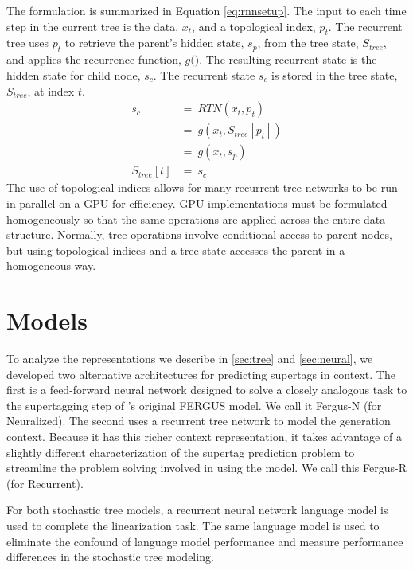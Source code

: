\documentclass[11pt]{article}
\begin{document}
The formulation is summarized in Equation \ref{eq:rnnsetup}.
%
The input to each time step in the current tree is the data, $x_t$, and a topological
index, $p_t$.
%
The recurrent tree uses $p_t$ to retrieve the parent's hidden state, $s_p$, from the
tree state, $S_{tree}$, and applies the recurrence function, $g(\dot)$.
%
The resulting recurrent state is the hidden state for child node, $s_c$.
%
The recurrent state $s_c$ is stored in the tree state, $S_{tree}$, at index $t$.
%
\begin{align}
       s_c~&=~RTN(x_t,p_t) \nonumber \\
           &=~g(x_t,S_{tree}[p_t]) \nonumber \\
           &=~g(x_t, s_p) \nonumber \\
S_{tree}[t]&=~s_c \label{eq:rnnsetup}
\end{align}
%
The use of topological indices allows for many recurrent tree networks to be
run in parallel on a GPU for efficiency.
%
GPU implementations must be formulated homogeneously so that 
the same operations are applied across the entire data structure.
%
Normally, tree operations involve conditional access to parent nodes,
but using topological indices and a tree state accesses the parent in
a homogeneous way.

\section{Models}
\label{sec:models}

To analyze the representations we describe in \ref{sec:tree} and
\ref{sec:neural}, we developed two alternative architectures for
predicting supertags in context.
%
The first is a feed-forward neural network designed to solve a closely
analogous task to the supertagging step of
's original FERGUS model.
%
We call it Fergus-N (for Neuralized).
%
The second uses a recurrent tree network to model the generation
context.
%
Because it has this richer context representation, it takes advantage
of a slightly different characterization of the supertag prediction
problem to streamline the problem solving involved in using the model.
%
We call this Fergus-R (for Recurrent).

For both stochastic tree models, a recurrent neural network language model is used to complete the linearization task.
%
%
The same language model is used to eliminate the confound of
language model performance and measure performance differences in the
stochastic tree modeling.
%
\end{document}
